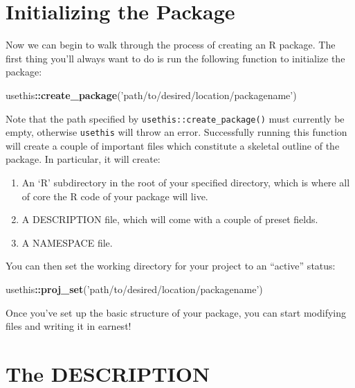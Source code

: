 \documentclass[]{book}
\newenvironment{Shaded}{\begin{snugshade}}{\end{snugshade}}
\newcommand{\KeywordTok}[1]{\textcolor[rgb]{0.13,0.29,0.53}{\textbf{#1}}}
\newcommand{\StringTok}[1]{\textcolor[rgb]{0.31,0.60,0.02}{#1}}
\newcommand{\OperatorTok}[1]{\textcolor[rgb]{0.81,0.36,0.00}{\textbf{#1}}}
\newcommand{\NormalTok}[1]{#1}
\providecommand{\tightlist}{%
  \setlength{\itemsep}{0pt}\setlength{\parskip}{0pt}}
\begin{document}
\section{Initializing the Package}\label{initializing-the-package}

Now we can begin to walk through the process of creating an R package.
The first thing you'll always want to do is run the following function
to initialize the package:

\begin{Shaded}
\begin{Highlighting}[]
\NormalTok{usethis}\OperatorTok{::}\KeywordTok{create_package}\NormalTok{(}\StringTok{'path/to/desired/location/packagename'}\NormalTok{)}
\end{Highlighting}
\end{Shaded}

Note that the path specified by \texttt{usethis::create\_package()} must
currently be empty, otherwise \texttt{usethis} will throw an error.
Successfully running this function will create a couple of important
files which constitute a skeletal outline of the package. In particular,
it will create:

\begin{enumerate}
\def\labelenumi{\arabic{enumi}.}
\tightlist
\item
  An `R' subdirectory in the root of your specified directory, which is
  where all of core the R code of your package will live.
\item
  A DESCRIPTION file, which will come with a couple of preset fields.
\item
  A NAMESPACE file.
\end{enumerate}

You can then set the working directory for your project to an ``active''
status:

\begin{Shaded}
\begin{Highlighting}[]
\NormalTok{usethis}\OperatorTok{::}\KeywordTok{proj_set}\NormalTok{(}\StringTok{'path/to/desired/location/packagename'}\NormalTok{)}
\end{Highlighting}
\end{Shaded}

Once you've set up the basic structure of your package, you can start
modifying files and writing it in earnest!

\section{The DESCRIPTION}\label{the-description}
\end{document}
